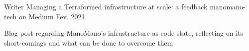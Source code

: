 

\begin{cventries}

  \cventry
    {Writer} %
    {Managing a Terraformed infrastructure at scale: a feedback} %
    {manomano-tech on Medium} %
    {Fev. 2021} %
    {
      \begin{cvitems} %
        \item {Blog post regarding ManoMano's infrastructure as code state, reflecting on its short-comings and what can be done to overcome them}
      \end{cvitems}
    }

\end{cventries}
